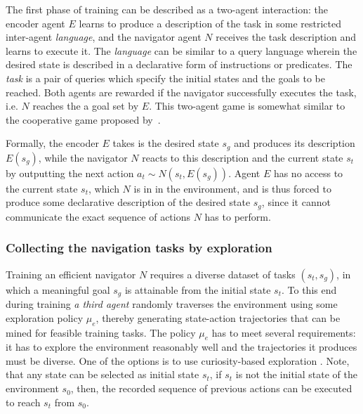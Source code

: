 \documentclass[acmsmall, nonacm]{acmart}
\begin{document}
The first phase of training can be described as a two-agent interaction: the encoder agent $E$ learns to produce a description of the task in some restricted inter-agent \emph{language}, and the navigator agent $N$ receives the task description and learns to execute it.
%
The \emph{language} can be similar to a query language wherein the desired state is described in a declarative form of instructions or predicates. The \emph{task} is a pair of queries which specify the initial states and the goals to be reached.
%
Both agents are rewarded if the navigator successfully executes the task, i.e. $N$ reaches the a goal set by $E$.
This two-agent game is somewhat similar to the cooperative game proposed by~\citet{Mordatch2018EmergenceOG}.

Formally, the encoder $E$ takes is the desired state $s_g$ and produces its description $E(s_g)$, while the navigator $N$ reacts to this description and the current state $s_t$ by outputting the next action $a_t \sim N(s_t, E(s_g))$. Agent $E$ has no access to the current state $s_t$, which $N$ is in in the environment, and is thus forced to produce some declarative description of the desired state $s_g$, since it cannot communicate the exact sequence of actions $N$ has to perform.

\subsubsection{Collecting the navigation tasks by exploration}

Training an efficient navigator $N$ requires a diverse dataset of tasks $(s_t, s_g)$, in which a meaningful goal $s_g$ is attainable from the initial state $s_t$. To this end during training \emph{a third agent} randomly traverses the environment using some exploration policy $\mu_e$, thereby generating state-action trajectories that can be mined for feasible training tasks. The policy $\mu_e$ has to meet several requirements: it has to explore the environment reasonably well and the trajectories it produces must be diverse. One of the options is to use curiosity-based exploration \citep{pathak_curiosity-driven_2017,burda_exploration_2019}.
Note, that any state can be selected as initial state $s_t$, if $s_t$ is not the initial state of the environment $s_0$, then, the recorded sequence of previous actions can be executed to reach $s_t$ from $s_0$.
\end{document}
